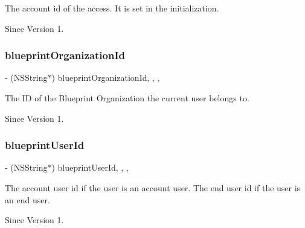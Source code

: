 The account id of the access. It is set in the initialization. 

\begin{DoxySince}{Since}
Version 1. 
\end{DoxySince}
\hypertarget{class_x_i_access_acf10b571cca2607d9ac4d2650d6368ac}{}\label{class_x_i_access_acf10b571cca2607d9ac4d2650d6368ac} 
\subsubsection{\texorpdfstring{blueprint\+Organization\+Id}{blueprintOrganizationId}}
{\footnotesize\ttfamily -\/ (N\+S\+String$\ast$) blueprint\+Organization\+Id\hspace{0.3cm}{\ttfamily [read]}, {\ttfamily [write]}, {\ttfamily [nonatomic]}, {\ttfamily [copy]}}



The ID of the Blueprint Organization the current user belongs to. 

\begin{DoxySince}{Since}
Version 1. 
\end{DoxySince}
\hypertarget{class_x_i_access_a0cda9e9bdd8e42272b9f302aad785a9b}{}\label{class_x_i_access_a0cda9e9bdd8e42272b9f302aad785a9b} 
\subsubsection{\texorpdfstring{blueprint\+User\+Id}{blueprintUserId}}
{\footnotesize\ttfamily -\/ (N\+S\+String$\ast$) blueprint\+User\+Id\hspace{0.3cm}{\ttfamily [read]}, {\ttfamily [write]}, {\ttfamily [nonatomic]}, {\ttfamily [copy]}}



The account user id if the user is an account user. The end user id if the user is an end user. 

\begin{DoxySince}{Since}
Version 1. 
\end{DoxySince}
\hypertarget{class_x_i_access_a8d12607e6e2dd1a4c19e88bdcf4a5924}{}\label{class_x_i_access_a8d12607e6e2dd1a4c19e88bdcf4a5924} 
